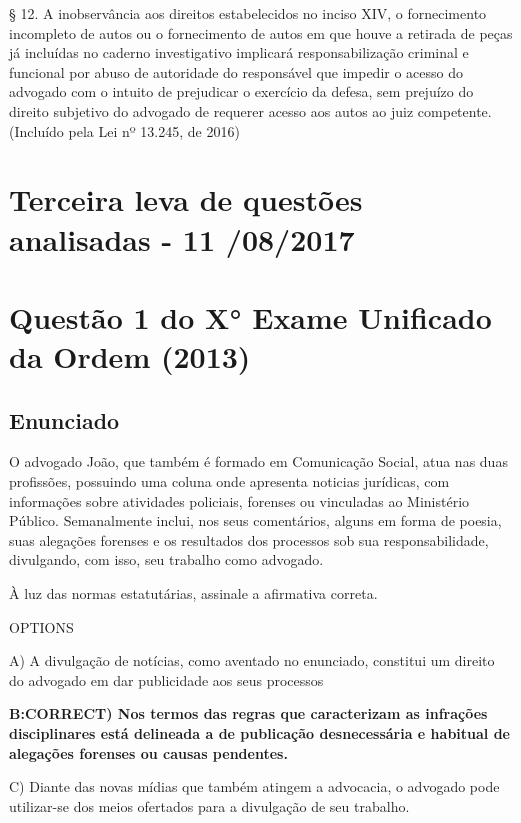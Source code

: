 \documentclass[12pt]{article}
\begin{document}
§ 12.  A inobservância aos direitos estabelecidos no inciso XIV, o fornecimento incompleto de autos ou o fornecimento de autos em que houve a retirada de peças já incluídas no caderno investigativo implicará responsabilização criminal e funcional por abuso de autoridade do responsável que impedir o acesso do advogado com o intuito de prejudicar o exercício da defesa, sem prejuízo do direito subjetivo do advogado de requerer acesso aos autos ao juiz competente.         (Incluído pela Lei nº 13.245, de 2016)

\noindent\makebox[\linewidth]{\rule{\paperwidth}{0.4pt}}


\section*{Terceira leva de questões analisadas - 11	/08/2017} 

\section{Questão 1 do X° Exame Unificado da Ordem (2013)}

\subsection{Enunciado}

O advogado João, que também é formado em Comunicação 
Social, atua nas duas profissões, possuindo uma coluna onde 
apresenta noticias jurídicas, com informações sobre atividades 
policiais, forenses ou vinculadas ao Ministério Público. 
Semanalmente inclui, nos seus comentários, alguns em forma 
de poesia, suas alegações forenses e os resultados dos 
processos sob sua responsabilidade, divulgando, com isso, seu 
trabalho como advogado. 
 
À luz das normas estatutárias, assinale a afirmativa correta. 
 
OPTIONS

A) A divulgação de notícias, como aventado no enunciado, 
constitui um direito do advogado em dar publicidade aos 
seus processos 

\textbf{B:CORRECT) Nos termos das regras que caracterizam as infrações 
disciplinares está delineada a de publicação desnecessária 
e habitual de alegações forenses ou causas pendentes. }

C) Diante das novas mídias que também atingem a advocacia, 
o advogado pode utilizar-se dos meios ofertados para a 
divulgação de seu trabalho. 
\end{document}
